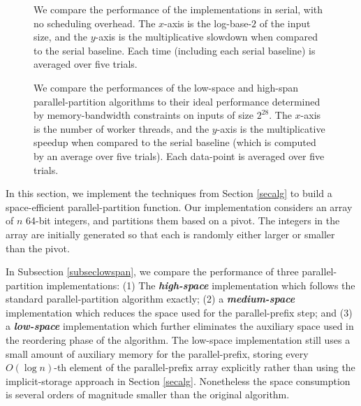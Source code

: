 \documentclass[sigconf]{acmart}
\newcommand{\defn}[1]       {{\textit{\textbf{\boldmath #1}}}}
\theoremstyle{remark}
\theoremstyle{remark}
\begin{document}
\begin{figure*}
  \begin{center}
    \serialtable
  \end{center}
  \caption{We compare the performance of the implementations in
    serial, with no scheduling overhead. The $x$-axis is the
    log-base-$2$ of the input size, and the $y$-axis is the
    multiplicative slowdown when compared to the serial baseline. Each
    time (including each serial baseline) is averaged over five
    trials.}
  \label{tableserial}
\end{figure*}

\begin{figure*}
  \begin{center}
    \partitionbandwidthboundtable
  \end{center}
  \caption{We compare the performances of the low-space and high-span
    parallel-partition algorithms to their ideal performance
    determined by memory-bandwidth constraints on inputs of size
    $2^{28}$. The $x$-axis is the number of worker threads, and the
    $y$-axis is the multiplicative speedup when compared to the serial
    baseline (which is computed by an average over five trials). Each
    data-point is averaged over five trials.}
  \label{tablebandwidth}
\end{figure*}


In this section, we implement the techniques from Section \ref{secalg}
to build a space-efficient parallel-partition function. Our
implementation considers an array of $n$ 64-bit integers, and
partitions them based on a pivot. The integers in the array are
initially generated so that each is randomly either larger or smaller
than the pivot.

In Subsection \ref{subseclowspan}, we compare the performance of three
parallel-partition implementations: (1) The \defn{high-space}
implementation which follows the standard parallel-partition algorithm
exactly; (2) a \defn{medium-space} implementation which reduces the
space used for the parallel-prefix step; and (3) a \defn{low-space}
implementation which further eliminates the auxiliary space used in the
reordering phase of the algorithm. The low-space implementation still
uses a small amount of auxiliary memory for the parallel-prefix,
storing every $O(\log n)$-th element of the parallel-prefix array
explicitly rather than using the implicit-storage approach in Section
\ref{secalg}. Nonetheless the space consumption is several orders of
magnitude smaller than the original algorithm.
\end{document}
